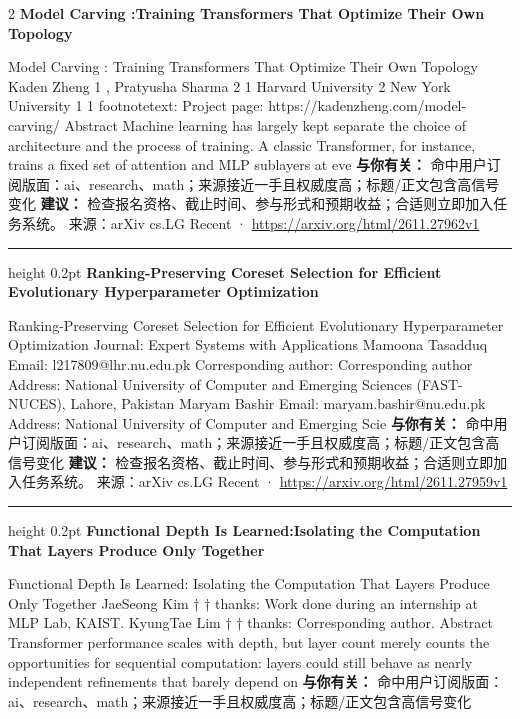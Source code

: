 \documentclass[10.5pt]{ctexart}
\begin{document}
\begin{multicols}{2}
{\large\bfseries Model Carving :Training Transformers That Optimize Their Own Topology}\par
Model Carving : Training Transformers That Optimize Their Own Topology Kaden Zheng 1 , Pratyusha Sharma 2 1 Harvard University 2 New York University 1 1 footnotetext: Project page: https://kadenzheng.com/model-carving/ Abstract Machine learning has largely kept separate the choice of architecture and the process of training. A classic Transformer, for instance, trains a fixed set of attention and MLP sublayers at eve
\textbf{与你有关：} 命中用户订阅版面：ai、research、math；来源接近一手且权威度高；标题/正文包含高信号变化
\textbf{建议：} 检查报名资格、截止时间、参与形式和预期收益；合适则立即加入任务系统。
{\footnotesize\color{ormuted} 来源：arXiv cs.LG Recent · \url{https://arxiv.org/html/2611.27962v1}}
\vspace{2mm}
\hrule height 0.2pt
\vspace{2mm}
{\large\bfseries Ranking-Preserving Coreset Selection for Efficient Evolutionary Hyperparameter Optimization}\par
Ranking-Preserving Coreset Selection for Efficient Evolutionary Hyperparameter Optimization Journal: Expert Systems with Applications Mamoona Tasadduq Email: l217809@lhr.nu.edu.pk Corresponding author: Corresponding author Address: National University of Computer and Emerging Sciences (FAST-NUCES), Lahore, Pakistan Maryam Bashir Email: maryam.bashir@nu.edu.pk Address: National University of Computer and Emerging Scie
\textbf{与你有关：} 命中用户订阅版面：ai、research、math；来源接近一手且权威度高；标题/正文包含高信号变化
\textbf{建议：} 检查报名资格、截止时间、参与形式和预期收益；合适则立即加入任务系统。
{\footnotesize\color{ormuted} 来源：arXiv cs.LG Recent · \url{https://arxiv.org/html/2611.27959v1}}
\vspace{2mm}
\hrule height 0.2pt
\vspace{2mm}
{\large\bfseries Functional Depth Is Learned:Isolating the Computation That Layers Produce Only Together}\par
Functional Depth Is Learned: Isolating the Computation That Layers Produce Only Together JaeSeong Kim † † thanks: Work done during an internship at MLP Lab, KAIST. KyungTae Lim † † thanks: Corresponding author. Abstract Transformer performance scales with depth, but layer count merely counts the opportunities for sequential computation: layers could still behave as nearly independent refinements that barely depend on
\textbf{与你有关：} 命中用户订阅版面：ai、research、math；来源接近一手且权威度高；标题/正文包含高信号变化

\end{multicols}
\end{document}
